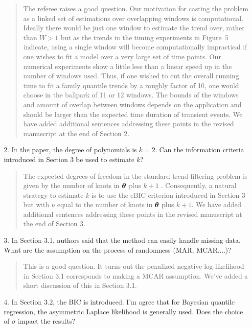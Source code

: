 \documentclass{article}
\newcommand{\V}[1]{{\bm{\mathbf{\MakeLowercase{#1}}}}} %
\begin{document}
\begin{quote}
The referee raises a good question. Our motivation for casting the problem as a linked set of estimations over overlapping windows is computational. Ideally there would be just one window to estimate the trend over, rather than $W > 1$ but as the trends in the timing experiments in Figure~5 indicate, using a single window will become computationally impractical if one wishes to fit a model over a very large set of time points. Our numerical experiments show a little less than a linear speed up in the number of windows used. Thus, if one wished to cut the overall running time to fit a family quantile trends by a roughly factor of 10, one would choose in the ballpark of 11 or 12 windows. The bounds of the windows and amount of overlap between windows depends on the application and should be larger than the expected time duration of transient events. We have added additional sentences addressing these points in the revised manuscript at the end of Section 2.
\end{quote}

2. In the paper, the degree of polynomials is $k=2$. Can the information criteria introduced in Section 3 be used to estimate $k$?

\begin{quote}
The expected degrees of freedom in the standard trend-filtering problem is given by the number of knots in $\V{\theta}$ plus $k+1$ \citep{Tib2014}. Consequently, a natural strategy to estimate $k$ is to use the eBIC criterion introduced in Section 3 but with $\nu$ equal to the number of knots in $\V{\theta}$ plus $k+1$. We have added additional sentences addressing these points in the revised manuscript at the end of Section 3.
\end{quote}

3. In Section 3.1, authors said that the method can easily handle missing data. What are the assumption on the process of randomness (MAR, MCAR,...)?

\begin{quote}
This is a good question. It turns out the penalized negative log-likelihood in Section 3.1 corresponds to making a MCAR assumption. We've added a short discussion of this in Section 3.1.
\end{quote}

4. In Section 3.2, the BIC is introduced. I'm agree that for Bayesian quantile regression, the asymmetric Laplace likelihood is generally used. Does the choice of $\sigma$ impact the results? 
\end{document}
